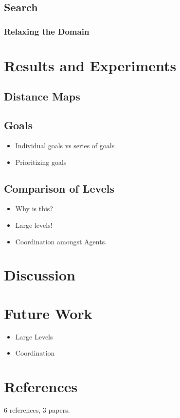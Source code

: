 \documentclass[letterpaper]{article}
\begin{document}
	\subsection{Search}
		\subsubsection{Relaxing the Domain}


\section{Results and Experiments}
	\subsection{Distance Maps}
	\subsection{Goals}
		\begin{itemize}
			\item{Individual goals vs series of goals}
			\item{Prioritizing goals}
		\end{itemize}

	\subsection{Comparison of Levels}
		\begin{itemize}
			\item{Why is this?}
			\item{Large levels!}
			\item{Coordination amongst Agents.}
		\end{itemize}

\section{Discussion}

\section{Future Work}
	\begin{itemize}
		\item{Large Levels}
		\item{Coordination}
	\end{itemize}

\section{References}
	6 references, 3 papers.
		
		


\end{document}
